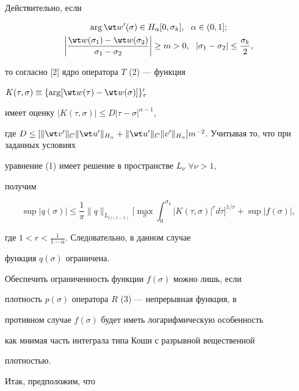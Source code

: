 Действительно, если


\begin{gather*}


\arg \wt w'(\sigma) \in H_{\alpha}[0,\sigma_k],\ \ \alpha \in (0,1]; \\


%


\bigg|\frac{\wt w(\sigma_1) - \wt w(\sigma_2)}{\sigma_1 -


\sigma_2}\bigg| \geq m > 0,


\ \ |\sigma_1 - \sigma_2| \leq \frac{\sigma_k}{2},


\end{gather*}


то согласно [2] ядро оператора $T$ (2) --- функция


$K(\tau,\sigma) \equiv \{\arg [\wt w(\tau) - \wt w(\sigma)]\}'_{\tau}$


имеет оценку $|K(\tau,\sigma)| \leq D |\tau - \sigma|^{\alpha - 1}$,


где $D \leq [\|\wt v'\|_C \|\wt u'\|_{H_{\alpha}} + \|\wt u'\|_C


\|v'\|_{H_{\alpha}}] m^{-2}$. Учитывая то, что при заданных условиях


уравнение (1) имеет решение в пространстве $L_{\nu}$ $\forall \nu >1$,


получим


$$


\sup|q(\sigma)| \leq \frac{1}{\pi} \|q\|_{L_{r/(r-1)}} \bigg[\max_{\sigma}


\int_0^{\sigma_k} |K(\tau,\sigma)|^r d\tau\bigg]^{1/r} + \sup |f(\sigma)|,


$$


где $1 < r < \frac{1}{1 - \alpha}$. Следовательно, в данном случае


функция $q(\sigma)$ ограничена.





Обеспечить ограниченность функции $f(\sigma)$ можно лишь, если


плотность $p(\sigma)$ оператора $R$ (3) --- непрерывная функция, в


противном случае $f(\sigma)$ будет иметь логарифмическую особенность


как мнимая часть интеграла типа Коши с разрывной вещественной


плотностью.





Итак, предположим, что


